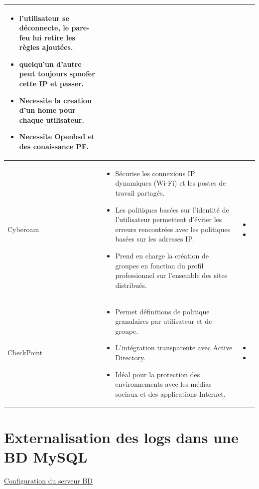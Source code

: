 \documentclass[12pt]{report}
\begin{document}
\begin{itemize}
\begin{longtable}{|p{4cm}|p{6cm}|p{6cm}|}
\begin{itemize}
        \item l'utilisateur se déconnecte, le pare-feu lui retire les règles ajoutées.
        \item quelqu'un d'autre peut toujours spoofer cette IP et passer.
        \item Necessite la creation d'un home pour chaque utilisateur.
        \item Necessite Openbsd et des conaissance PF.
    \end{itemize} \\
  \hline
    Cyberoam&
    \begin{itemize}
        \item Sécurise les connexions IP dynamiques (Wi-Fi) et les postes de travail partagés.
        \item Les politiques basées sur l'identité de l'utilisateur permettent d'éviter les erreurs rencontrées avec les politiques basées sur les adresses IP.
        \item Prend en charge la création de groupes en fonction du profil professionnel sur l'ensemble des sites distribués.
    \end{itemize}&
    \begin{itemize}
        \item 
        \item 
    \end{itemize} \\
  \hline
    CheckPoint&
    \begin{itemize}
        \item Permet définitions de politique granulaires par utilisateur et de groupe.
        \item L'intégration transparente avec Active Directory.
        \item Idéal pour la protection des environnements avec les médias sociaux et des applications Internet.
    \end{itemize}&
    \begin{itemize}
        \item 
        \item 
    \end{itemize} \\
    \hline
\end{longtable}
\newligne
\chapter{Externalisation des logs dans une BD MySQL}
\underline{Configuration du serveur BD}


\end{itemize}
\end{document}
